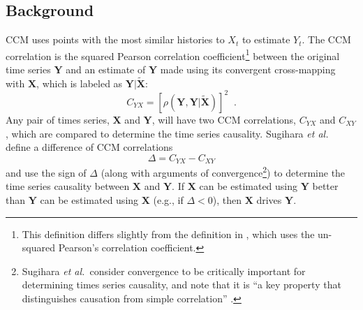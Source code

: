 \subsection{Background}
CCM uses points with the most similar histories to $X_t$ to estimate $Y_t$.  The CCM correlation is the squared Pearson correlation coefficient\footnote{This definition differs slightly from the definition in \cite{Sugihara2012}, which uses the un-squared Pearson’s correlation coefficient.} between the original time series $\mathbf{Y}$ and an estimate of $\mathbf{Y}$ made using its convergent cross-mapping with $\mathbf{X}$, which is labeled as $\mathbf{Y}|\tilde{\mathbf{X}}$:
\begin{equation}
C_{YX} = \left[\rho(\mathbf{Y},\mathbf{Y}|\tilde{\mathbf{X}})\right]^2\;\;.
\end{equation}
Any pair of times series, $\mathbf{X}$ and $\mathbf{Y}$, will have two CCM correlations, $C_{YX}$ and $C_{XY}$, which are compared to determine the time series causality.  Sugihara {\em et al.\ }\cite{Sugihara2012} define a difference of CCM correlations
\begin{equation}
\label{eqn:delta}
\Delta = C_{YX} - C_{XY}
\end{equation}
and use the sign of $\Delta$ (along with arguments of convergence\footnote{Sugihara {\em et al.\ }consider convergence to be critically important for determining times series causality, and note that it is ``a key property that distinguishes causation from simple correlation'' \cite{Sugihara2012}.}) to determine the time series causality between $\mathbf{X}$ and $\mathbf{Y}$.  If $\mathbf{X}$ can be estimated using $\mathbf{Y}$ better than $\mathbf{Y}$ can be estimated using $\mathbf{X}$ (e.g., if $\Delta < 0$), then $\mathbf{X}$ drives $\mathbf{Y}$.

